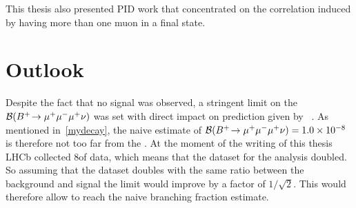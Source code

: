 This thesis also presented \gls{PID} work that concentrated on the correlation induced by having more than one muon in a final state.


\section{Outlook}
Despite the fact that no signal was observed, a stringent limit on the $\mathcal{B}({{{B}^+}}\!\rightarrow {\ensuremath{\mu^+\mu^-\mu^+}}\nu)$ was set with direct impact on \DIFaddbegin {}\DIFaddend prediction given by ~\cite{Danilina:2018uzr}. As mentioned in~\autoref{mydecay}, the naive estimate of $\mathcal{B}({{{B}^+}}\!\rightarrow {\ensuremath{\mu^+\mu^-\mu^+}}\nu)=1.0\times 10^{-8}$ is therefore not too far from the \DIFdelbegin {}\DIFdelend \DIFaddbegin {}\DIFaddend . At the moment of the writing of this thesis \gls{LHCb} collected 8\invfb of data, which means that the dataset for the analysis doubled. So assuming that the dataset doubles with the same ratio between the background and signal the limit would improve by a factor of $1/\sqrt{2}$. This would therefore allow \DIFaddbegin {}\DIFaddend to reach the naive branching fraction estimate. 


